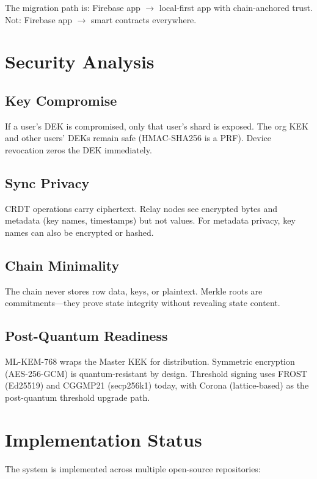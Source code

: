 \documentclass[twocolumn,11pt]{article}
\begin{document}
The migration path is: Firebase app $\to$ local-first app with chain-anchored trust. Not: Firebase app $\to$ smart contracts everywhere.

\section{Security Analysis}

\subsection{Key Compromise}

If a user's DEK is compromised, only that user's shard is exposed. The org KEK and other users' DEKs remain safe (HMAC-SHA256 is a PRF). Device revocation zeros the DEK immediately.

\subsection{Sync Privacy}

CRDT operations carry ciphertext. Relay nodes see encrypted bytes and metadata (key names, timestamps) but not values. For metadata privacy, key names can also be encrypted or hashed.

\subsection{Chain Minimality}

The chain never stores row data, keys, or plaintext. Merkle roots are commitments---they prove state integrity without revealing state content.

\subsection{Post-Quantum Readiness}

ML-KEM-768 wraps the Master KEK for distribution. Symmetric encryption (AES-256-GCM) is quantum-resistant by design. Threshold signing uses FROST (Ed25519) and CGGMP21 (secp256k1) today, with Corona (lattice-based) as the post-quantum threshold upgrade path.

\section{Implementation Status}

The system is implemented across multiple open-source repositories:
\end{document}
